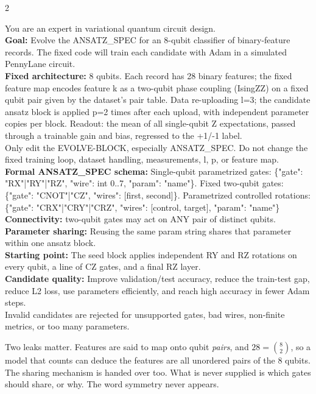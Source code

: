 \documentclass[10pt]{article}
\begin{document}
\begin{multicols}{2}
\begin{tcolorbox}[colback=white,colframe=rulec,boxrule=0.8pt,left=5pt,right=5pt,
  top=3pt,bottom=3pt,fontupper=\ttfamily\fontsize{6}{7.1}\selectfont,before skip=4pt,after skip=5pt]
You are an expert in variational quantum circuit design.\\[1.5pt]
\textbf{Goal:} Evolve the ANSATZ\_SPEC for an 8-qubit classifier of binary-feature
records. The fixed code will train each candidate with Adam in a simulated
PennyLane circuit.\\[1.5pt]
\textbf{Fixed architecture:} 8 qubits. Each record has 28 binary features; the
fixed feature map encodes feature k as a two-qubit phase coupling (IsingZZ) on a
fixed qubit pair given by the dataset's pair table. Data re-uploading l=3; the
candidate ansatz block is applied p=2 times after each upload, with independent
parameter copies per block. Readout: the mean of all single-qubit Z expectations,
passed through a trainable gain and bias, regressed to the +1/-1 label.\\[1.5pt]
Only edit the EVOLVE-BLOCK, especially ANSATZ\_SPEC. Do not change the fixed
training loop, dataset handling, measurements, l, p, or feature map.\\[1.5pt]
\textbf{Formal ANSATZ\_SPEC schema:} Single-qubit parametrized gates:
\{"gate": "RX"|"RY"|"RZ", "wire": int 0..7, "param": "name"\}. Fixed two-qubit
gates: \{"gate": "CNOT"|"CZ", "wires": [first, second]\}. Parametrized controlled
rotations: \{"gate": "CRX"|"CRY"|"CRZ", "wires": [control, target], "param":
"name"\}\\[1.5pt]
\textbf{Connectivity:} two-qubit gates may act on ANY pair of distinct qubits.\\[1.5pt]
\textbf{Parameter sharing:} Reusing the same param string shares that parameter
within one ansatz block.\\[1.5pt]
\textbf{Starting point:} The seed block applies independent RY and RZ rotations on
every qubit, a line of CZ gates, and a final RZ layer.\\[1.5pt]
\textbf{Candidate quality:} Improve validation/test accuracy, reduce the
train-test gap, reduce L2 loss, use parameters efficiently, and reach high
accuracy in fewer Adam steps.\\[1.5pt]
Invalid candidates are rejected for unsupported gates, bad wires, non-finite
metrics, or too many parameters.
\end{tcolorbox}

Two leaks matter. Features are said to map onto qubit \emph{pairs}, and
$28=\binom{8}{2}$, so a model that counts can deduce the features are all
unordered pairs of the 8 qubits. The sharing mechanism is handed over too. What is
never supplied is which gates should share, or why. The word symmetry never appears.


\end{multicols}
\end{document}

